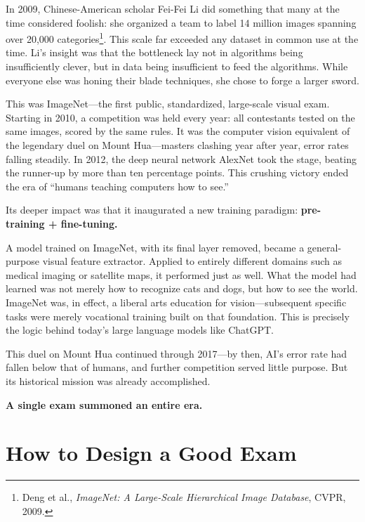 \vspace{1em}

In 2009, Chinese-American scholar Fei-Fei Li did something that many at the time considered foolish: she organized a team to label 14 million images spanning over 20,000 categories\footnote{Deng et al., \textit{ImageNet: A Large-Scale Hierarchical Image Database}, CVPR, 2009.}. This scale far exceeded any dataset in common use at the time.
Li's insight was that the bottleneck lay not in algorithms being insufficiently clever, but in data being insufficient to feed the algorithms. While everyone else was honing their blade techniques, she chose to forge a larger sword.

\vspace{1em}

This was ImageNet---the first public, standardized, large-scale visual exam.
Starting in 2010, a competition was held every year: all contestants tested on the same images, scored by the same rules. It was the computer vision equivalent of the legendary duel on Mount Hua---masters clashing year after year, error rates falling steadily. In 2012, the deep neural network AlexNet took the stage, beating the runner-up by more than ten percentage points. This crushing victory ended the era of ``humans teaching computers how to see.''

\vspace{1em}

Its deeper impact was that it inaugurated a new training paradigm: \textbf{pre-training + fine-tuning.}

A model trained on ImageNet, with its final layer removed, became a general-purpose visual feature extractor. Applied to entirely different domains such as medical imaging or satellite maps, it performed just as well. What the model had learned was not merely how to recognize cats and dogs, but how to see the world. ImageNet was, in effect, a liberal arts education for vision---subsequent specific tasks were merely vocational training built on that foundation. This is precisely the logic behind today's large language models like ChatGPT.

This duel on Mount Hua continued through 2017---by then, AI's error rate had fallen below that of humans, and further competition served little purpose. But its historical mission was already accomplished.

\textbf{A single exam summoned an entire era.}

\section{How to Design a Good Exam}

